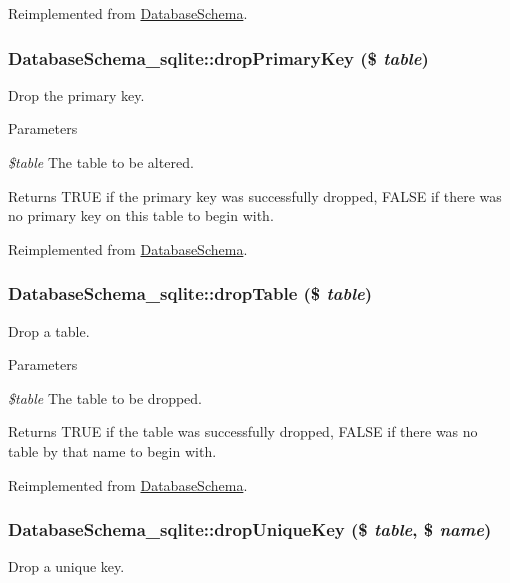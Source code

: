 Reimplemented from \hyperlink{classDatabaseSchema_adf5467aa59e462857527d8f1a5988a81}{DatabaseSchema}.\hypertarget{classDatabaseSchema__sqlite_a2fe8b467c14e7fca2f24b2af6487db4c}{
\subsubsection[{dropPrimaryKey}]{\setlength{\rightskip}{0pt plus 5cm}DatabaseSchema\_\-sqlite::dropPrimaryKey (\$ {\em table})}}
\label{classDatabaseSchema__sqlite_a2fe8b467c14e7fca2f24b2af6487db4c}
Drop the primary key.


\begin{DoxyParams}{Parameters}
\item[{\em \$table}]The table to be altered.\end{DoxyParams}
\begin{DoxyReturn}{Returns}
TRUE if the primary key was successfully dropped, FALSE if there was no primary key on this table to begin with. 
\end{DoxyReturn}


Reimplemented from \hyperlink{classDatabaseSchema_a08057609758a32c13c4d1863da54b63e}{DatabaseSchema}.\hypertarget{classDatabaseSchema__sqlite_adfb4c367167a77d523c3d002af1fc7cc}{
\subsubsection[{dropTable}]{\setlength{\rightskip}{0pt plus 5cm}DatabaseSchema\_\-sqlite::dropTable (\$ {\em table})}}
\label{classDatabaseSchema__sqlite_adfb4c367167a77d523c3d002af1fc7cc}
Drop a table.


\begin{DoxyParams}{Parameters}
\item[{\em \$table}]The table to be dropped.\end{DoxyParams}
\begin{DoxyReturn}{Returns}
TRUE if the table was successfully dropped, FALSE if there was no table by that name to begin with. 
\end{DoxyReturn}


Reimplemented from \hyperlink{classDatabaseSchema_a61a37e713374b88d28161e0ade1a5c78}{DatabaseSchema}.\hypertarget{classDatabaseSchema__sqlite_a93c409d48623019e1a5c1a2ff881c2c7}{
\subsubsection[{dropUniqueKey}]{\setlength{\rightskip}{0pt plus 5cm}DatabaseSchema\_\-sqlite::dropUniqueKey (\$ {\em table}, \/  \$ {\em name})}}
\label{classDatabaseSchema__sqlite_a93c409d48623019e1a5c1a2ff881c2c7}
Drop a unique key.


